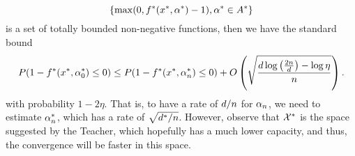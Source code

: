 $$\left\{\max(0, f^*(x^*, \alpha^*)- 1), \alpha^* \in A^*\right\}$$
 is a set of totally bounded non-negative functions, then we have the standard bound~\cite{vapnik2013nature}
\begin{equation}
    \nonumber
    P(1 - f^*(x^*, \alpha^*_0) \leq 0) \leq P(1 - f^*(x^*, \alpha^*_n) \leq 0) + O\left( \sqrt{\frac{d \log\left(\frac{2n}{d} \right) - \log\eta}{n}}  \right) .
\end{equation}
with probability $1 - 2\eta$.
That is, to have a rate of $d/n$ for $\alpha_n$, we need to estimate $\alpha^*_n$, which has a rate of $\sqrt{d^*/n}$. However, observe that $\mathcal{X}^*$ is the space suggested by the Teacher, which hopefully has a much lower capacity, and thus, the convergence will be faster in this space.

